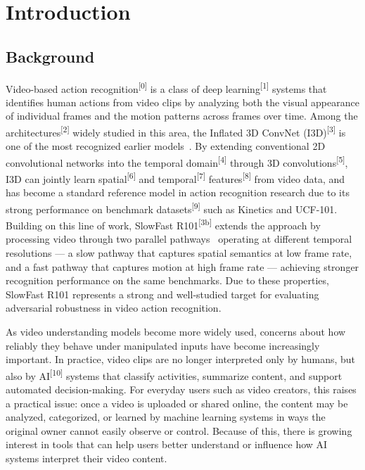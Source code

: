 \chapter{Introduction}
\label{chap:introduction}

\section{Background}
\label{section:background}

Video-based action recognition\textsuperscript{[0]} is a class of deep learning\textsuperscript{[1]} systems that identifies human actions from video clips by analyzing both the visual appearance of individual frames and the motion patterns across frames over time. Among the architectures\textsuperscript{[2]} widely studied in this area, the Inflated 3D ConvNet (I3D)\textsuperscript{[3]} is one of the most recognized earlier models~\cite{carreira2017quo}. By extending conventional 2D convolutional networks into the temporal domain\textsuperscript{[4]} through 3D convolutions\textsuperscript{[5]}, I3D can jointly learn spatial\textsuperscript{[6]} and temporal\textsuperscript{[7]} features\textsuperscript{[8]} from video data, and has become a standard reference model in action recognition research due to its strong performance on benchmark datasets\textsuperscript{[9]} such as Kinetics and UCF-101. Building on this line of work, SlowFast R101\textsuperscript{[3b]} extends the approach by processing video through two parallel pathways~\cite{feichtenhofer2019slowfast} operating at different temporal resolutions — a slow pathway that captures spatial semantics at low frame rate, and a fast pathway that captures motion at high frame rate — achieving stronger recognition performance on the same benchmarks. Due to these properties, SlowFast R101 represents a strong and well-studied target for evaluating adversarial robustness in video action recognition.

As video understanding models become more widely used, concerns about how reliably they behave under manipulated inputs have become increasingly important. In practice, video clips are no longer interpreted only by humans, but also by AI\textsuperscript{[10]} systems that classify activities, summarize content, and support automated decision-making. For everyday users such as video creators, this raises a practical issue: once a video is uploaded or shared online, the content may be analyzed, categorized, or learned by machine learning systems in ways the original owner cannot easily observe or control. Because of this, there is growing interest in tools that can help users better understand or influence how AI systems interpret their video content.


